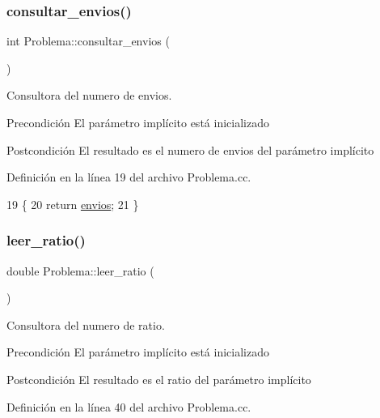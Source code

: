 \subsubsection{\texorpdfstring{consultar\+\_\+envios()}{consultar\_envios()}}
{\footnotesize\ttfamily int Problema\+::consultar\+\_\+envios (\begin{DoxyParamCaption}{ }\end{DoxyParamCaption})}



Consultora del numero de envios. 

\begin{DoxyPrecond}{Precondición}
El parámetro implícito está inicializado 
\end{DoxyPrecond}
\begin{DoxyPostcond}{Postcondición}
El resultado es el numero de envios del parámetro implícito 
\end{DoxyPostcond}


Definición en la línea 19 del archivo Problema.\+cc.


\begin{DoxyCode}
19                               \{
20   \textcolor{keywordflow}{return} \mbox{\hyperlink{class_problema_aaef8dcb723fa829a052517a00aed003e}{envios}};
21 \}
\end{DoxyCode}
\mbox{\label{class_problema_a06627ca42b5bf8598d10b04e6a9e255b}} 
\subsubsection{\texorpdfstring{leer\+\_\+ratio()}{leer\_ratio()}}
{\footnotesize\ttfamily double Problema\+::leer\+\_\+ratio (\begin{DoxyParamCaption}{ }\end{DoxyParamCaption})}



Consultora del numero de ratio. 

\begin{DoxyPrecond}{Precondición}
El parámetro implícito está inicializado 
\end{DoxyPrecond}
\begin{DoxyPostcond}{Postcondición}
El resultado es el ratio del parámetro implícito 
\end{DoxyPostcond}


Definición en la línea 40 del archivo Problema.\+cc.



